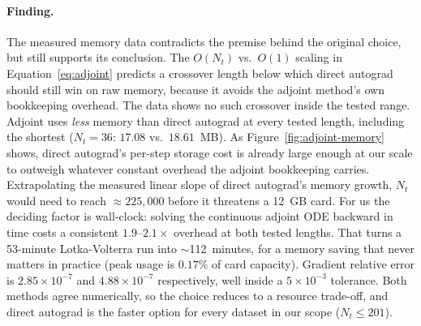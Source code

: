 \paragraph{Finding.} The measured memory data contradicts the premise behind
the original choice, but still supports its conclusion. The $O(N_t)$ vs.\
$O(1)$ scaling in Equation~\ref{eq:adjoint} predicts a crossover length below
which direct autograd should still win on raw memory, because it avoids the
adjoint method's own bookkeeping overhead. The data shows no such crossover
inside the tested range. Adjoint uses \emph{less} memory than direct autograd
at every tested length, including the shortest ($N_t=36$: $17.08$ vs.\
$18.61$~MB). As Figure~\ref{fig:adjoint-memory} shows, direct autograd's
per-step storage cost is already large enough at our scale to outweigh
whatever constant overhead the adjoint bookkeeping carries.
Extrapolating the measured linear slope of direct autograd's memory growth,
$N_t$ would need to reach $\approx225{,}000$ before it threatens a 12~GB
card. For us the deciding factor is wall-clock: solving the continuous
adjoint ODE backward in time costs a consistent $1.9$--$2.1\times$ overhead
at both tested lengths. That turns a 53-minute Lotka-Volterra run into
$\sim$112~minutes, for a memory saving that never matters in practice (peak
usage is $0.17\%$ of card capacity). Gradient relative error is
$2.85\times10^{-7}$ and $4.88\times10^{-7}$ respectively, well inside a
$5\times10^{-3}$ tolerance. Both methods agree numerically, so the choice
reduces to a resource trade-off, and direct autograd is the faster option
for every dataset in our scope ($N_t\le201$).
